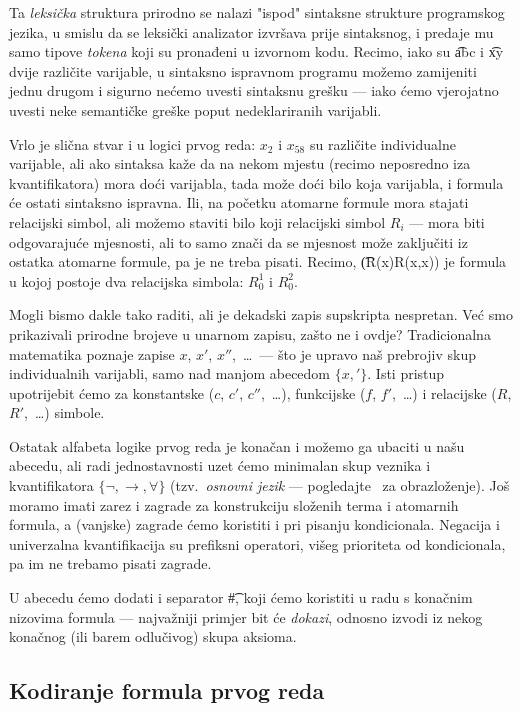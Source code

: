 Ta \emph{leksička} struktura prirodno se nalazi "ispod" sintaksne strukture programskog jezika, u smislu da se leksički analizator izvršava prije sintaksnog, i predaje mu samo tipove \emph{tokena} koji su pronađeni u izvornom kodu. Recimo, iako su \t{abc} i \t{xy} dvije različite varijable, u sintaksno ispravnom programu možemo zamijeniti jednu drugom i sigurno nećemo uvesti sintaksnu grešku --- iako ćemo vjerojatno uvesti neke semantičke greške poput nedeklariranih varijabli.

Vrlo je slična stvar i u logici prvog reda: $x_2$ i $x_{58}$ su različite individualne varijable, ali ako sintaksa kaže da na nekom mjestu (recimo neposredno iza kvantifikatora) mora doći varijabla, tada može doći bilo koja varijabla, i formula će ostati sintaksno ispravna. Ili, na početku atomarne formule mora stajati relacijski simbol, ali možemo staviti bilo koji relacijski simbol $R_i$ --- mora biti odgovarajuće mjesnosti, ali to samo znači da se mjesnost može zaključiti iz ostatka atomarne formule, pa je ne treba pisati. Recimo, \t{(R(x)\textrightarrow R(x,x))} je formula u kojoj postoje dva relacijska simbola: $R_0^1$ i $R_0^2$.

Mogli bismo dakle tako raditi, ali je dekadski zapis supskripta nespretan. Već smo prikazivali prirodne brojeve u unarnom zapisu, zašto ne i ovdje? Tradicionalna matematika poznaje zapise $x$, $x'$, $x''$,~\ldots\ --- što je upravo naš prebrojiv skup individualnih varijabli, samo nad manjom abecedom $\{x,'\!\}$. Isti pristup upotrijebit ćemo za konstantske ($c$, $c'$, $c''$,~\ldots), funkcijske ($f$, $f'$,~\ldots) i relacijske ($R$, $R'$,~\ldots) simbole.

Ostatak alfabeta logike prvog reda je konačan i možemo ga ubaciti u našu abecedu, ali radi jednostavnosti uzet ćemo minimalan skup veznika i kvantifikatora $\{\lnot,\to,\forall\}$ (tzv.\ \emph{osnovni jezik} --- pogledajte~\cite[str.\ 124]{skr:VukML} za obrazloženje). Još moramo imati zarez i zagrade za konstrukciju složenih terma i atomarnih formula, a (vanjske) zagrade ćemo koristiti i pri pisanju kondicionala. Negacija i univerzalna kvantifikacija su prefiksni operatori, višeg prioriteta od kondicionala, pa im ne trebamo pisati zagrade.

U abecedu ćemo dodati i separator \t\#, koji ćemo koristiti u radu s konačnim nizovima formula --- najvažniji primjer bit će \emph{dokazi}, odnosno izvodi iz nekog konačnog (ili barem odlučivog) skupa aksioma.

\subsection{Kodiranje formula prvog reda}

